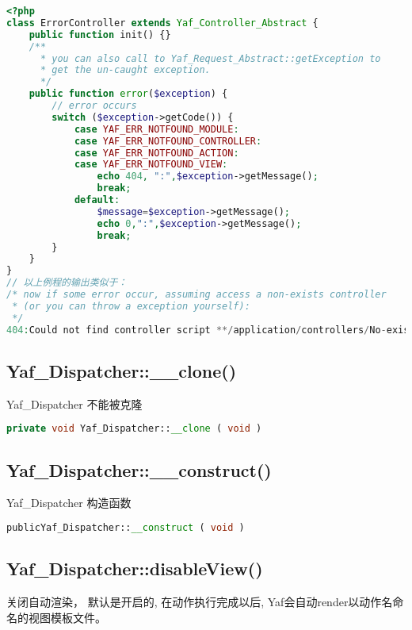\begin{lstlisting}[language=PHP]
<?php
class ErrorController extends Yaf_Controller_Abstract {
    public function init() {}
    /** 
      * you can also call to Yaf_Request_Abstract::getException to  
      * get the un-caught exception.
      */
    public function error($exception) {
        // error occurs
        switch ($exception->getCode()) {
            case YAF_ERR_NOTFOUND_MODULE:
            case YAF_ERR_NOTFOUND_CONTROLLER:
            case YAF_ERR_NOTFOUND_ACTION:
            case YAF_ERR_NOTFOUND_VIEW:
                echo 404, ":",$exception->getMessage();
                break;
            default:
                $message=$exception->getMessage();
                echo 0,":",$exception->getMessage();
                break;
        }
    }
}
// 以上例程的输出类似于：
/* now if some error occur, assuming access a non-exists controller
 * (or you can throw a exception yourself): 
 */
404:Could not find controller script **/application/controllers/No-exists-controller.php
\end{lstlisting}



\subsection{Yaf\_Dispatcher::\_\_clone()}

 Yaf\_Dispatcher 不能被克隆


\begin{lstlisting}[language=PHP]
private void Yaf_Dispatcher::__clone ( void )
\end{lstlisting}




\subsection{Yaf\_Dispatcher::\_\_construct()}

Yaf\_Dispatcher 构造函数

\begin{lstlisting}[language=PHP]
publicYaf_Dispatcher::__construct ( void )
\end{lstlisting}



\subsection{Yaf\_Dispatcher::disableView()}

关闭自动渲染， 默认是开启的, 在动作执行完成以后, Yaf会自动render以动作名命名的视图模板文件。


